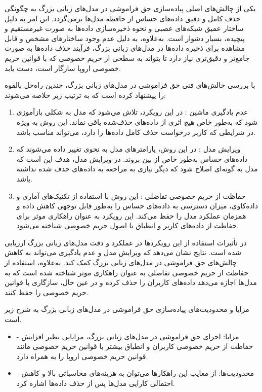 یکی از چالش‌های اصلی پیاده‌سازی حق فراموشی در مدل‌های زبانی بزرگ به چگونگی حذف کامل و دقیق داده‌های حساس از حافظه مدل‌ها برمی‌گردد. این امر به دلیل ساختار عمیق شبکه‌های عصبی و نحوه ذخیره‌سازی داده‌ها به صورت غیرمستقیم و پیچیده، بسیار دشوار است. به‌علاوه، به دلیل عدم وجود ساختارهای مشخص و قابل مشاهده برای ذخیره داده‌ها در مدل‌های زبانی بزرگ، فرآیند حذف داده‌ها به صورت جامع‌تر و دقیق‌تری نیاز دارد تا بتواند به سطحی از حریم خصوصی که با قوانین حریم خصوصی اروپا سازگار است، دست یابد. 

\cite{zhang2024right}
 با بررسی چالش‌های فنی حق فراموشی در مدل‌های زبانی بزرگ، چندین راه‌حل بالقوه را پیشنهاد کرده است که به ترتیب زیر خلاصه می‌شوند:
\begin{enumerate}
\item

عدم یادگیری ماشین%
: در این رویکرد، تلاش می‌شود که مدل به شکلی بازآموزی شود که به‌طور خاص هیچ اثری از داده‌های حذف‌شده باقی نماند. این روش به ویژه در شرایطی که کاربر درخواست حذف کامل داده‌ها را دارد، می‌تواند مناسب باشد.
\item
ویرایش مدل%
: در این روش، پارامترهای مدل به نحوی تغییر داده می‌شوند که داده‌های حساس به‌طور خاص از بین بروند. در ویرایش مدل، هدف این است که مدل به گونه‌ای اصلاح شود که دیگر نیازی به مراجعه به داده‌های حذف شده نداشته باشد.
\item
حفاظت از حریم خصوصی تفاضلی %
: این روش با استفاده از تکنیک‌های آماری و داده‌کاوی، میزان دسترسی به داده‌های حساس را به‌طور قابل توجهی کاهش داده و همزمان عملکرد مدل را حفظ می‌کند. این رویکرد به عنوان راهکاری موثر برای حفاظت از داده‌های کاربر و انطباق با اصول حریم خصوصی شناخته می‌شود.
\end{enumerate}

در 
\cite{zhang2024right}
 تأثیرات استفاده از این رویکردها در عملکرد و دقت مدل‌های زبانی بزرگ ارزیابی شده است. نتایج نشان می‌دهد که ویرایش مدل و عدم یادگیری می‌تواند به کاهش چالش‌های حق فراموشی در مدل‌های زبانی بزرگ کمک کند. به‌علاوه، استفاده از حفاظت از حریم خصوصی تفاضلی به عنوان راهکاری موثر شناخته شده است که به مدل‌ها اجازه می‌دهد داده‌های کاربران را حذف کرده و در عین حال، سازگاری با قوانین حریم خصوصی را حفظ کنند.

 مزایا و محدودیت‌های پیاده‌سازی حق فراموشی در مدل‌های زبانی بزرگ به شرح زیر است.
\begin{itemize}
\item
- مزایا: اجرای حق فراموشی در مدل‌های زبانی بزرگ، مزایایی نظیر افزایش حفاظت از حریم خصوصی کاربران و انطباق بیشتر با قوانین حریم خصوصی مانند قوانین حریم خصوصی اروپا را به همراه دارد.
\item
- محدودیت‌ها: از معایب این راهکارها می‌توان به هزینه‌های محاسباتی بالا و کاهش احتمالی کارایی مدل‌ها پس از حذف داده‌ها اشاره کرد. 
\end{itemize}

